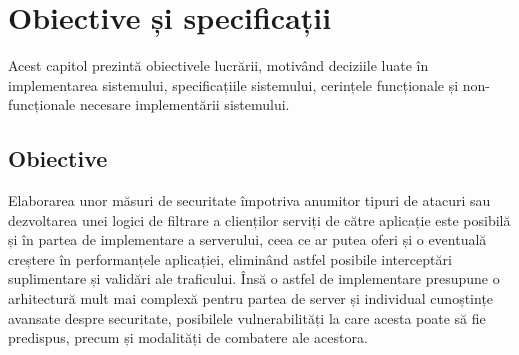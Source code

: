 
 \chapter{Obiective și specificații}
\label{cap:obiective-specificatii}

%

Acest capitol prezintă obiectivele lucrării, motivând deciziile luate în implementarea sistemului, specificațiile sistemului, cerințele funcționale și non-funcționale necesare implementării sistemului. 

 \section{Obiective}
%
Elaborarea unor măsuri de securitate împotriva anumitor tipuri de atacuri sau dezvoltarea unei logici de filtrare a clienților serviți de către aplicație este posibilă și în partea de implementare a serverului, ceea ce ar putea oferi și o eventuală creștere în performanțele aplicației, eliminând astfel posibile interceptări suplimentare și validări ale traficului. Însă o astfel de implementare presupune o arhitectură mult mai complexă pentru partea de server și individual cunoștințe avansate despre securitate, posibilele vulnerabilități la care acesta poate să fie predispus, precum și modalități de combatere ale acestora.  
  
